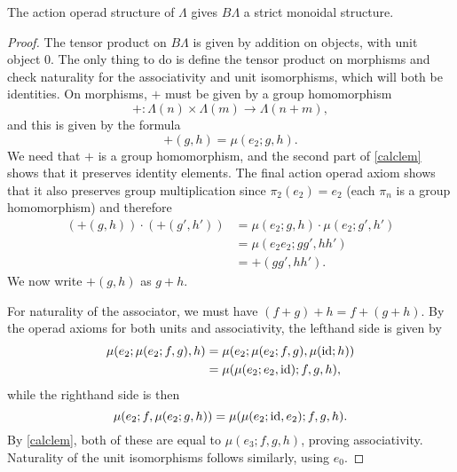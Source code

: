 \begin{prop}\label{Gmonoidal}
The action operad structure of $\Lambda$ gives $B\Lambda$ a strict monoidal structure.
\end{prop}
\begin{proof}
The tensor product on $B\Lambda$ is given by addition on objects, with unit object 0. The only thing to do is define the tensor product on morphisms and check naturality for the associativity and unit isomorphisms, which will both be identities. On morphisms, $+$ must be given by a group homomorphism
  \[
    + \colon \Lambda(n) \times \Lambda(m) \rightarrow \Lambda(n+m),
  \]
 and this is given by the formula
  \[
    +(g,h) = \mu(e_{2}; g,h).
  \]
We need that $+$ is a group homomorphism, and the second part of \cref{calclem} shows that it preserves identity elements. The final action operad axiom shows that it also preserves group multiplication since $\pi_{2}(e_{2}) = e_{2}$ (each $\pi_{n}$ is a group homomorphism) and therefore
  \begin{align*}
    \left(+(g,h)\right) \cdot \left(+(g',h')\right) &= \mu\left(e_{2}; g,h\right) \cdot\mu\left(e_{2}; g',h'\right) \\
    &= \mu\left(e_{2}e_{2}; gg', hh'\right) \\
    &= +\left(gg',hh'\right).
  \end{align*}
We now write $+(g,h)$ as $g+h$.

For naturality of the associator, we must have $(f+g)+h = f+(g+h)$. By the operad axioms for both units and associativity, the lefthand side is given by
  \begin{align*}
    \mu(e_{2}; \mu(e_{2}; f,g), h) &= \mu(e_{2}; \mu(e_{2}; f,g), \mu(\textrm{id};h)) \\
    &= \mu(\mu(e_{2}; e_{2}, \textrm{id}); f,g,h),
  \end{align*}
while the righthand side is then
  \[
    \mu(e_{2}; f, \mu(e_{2}; g,h)) = \mu(\mu(e_{2}; \textrm{id}, e_{2}); f,g,h).
  \]
By \cref{calclem}, both of these are equal to $\mu(e_{3}; f,g,h)$, proving associativity. Naturality of the unit isomorphisms follows similarly, using $e_{0}$.
\end{proof}

